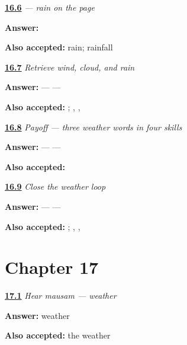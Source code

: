 \noindent\begin{minipage}[t]{\linewidth}
\raggedright
\hyperlink{review-MW-C11-barsaat-dictation}{\textbf{16.6}} \emph{ — rain on the page}\par
\small \textbf{Answer:} \par
\footnotesize \textbf{Also accepted:}  rain;  rainfall
\end{minipage}\par\medskip

\noindent\begin{minipage}[t]{\linewidth}
\raggedright
\hyperlink{review-MW-R11-weather-three-recall}{\textbf{16.7}} \emph{Retrieve wind, cloud, and rain}\par
\small \textbf{Answer:}  —  — \par
\footnotesize \textbf{Also accepted:}   ; , , 
\end{minipage}\par\medskip

\noindent\begin{minipage}[t]{\linewidth}
\raggedright
\hyperlink{review-MW-C11-weather-three-payoff}{\textbf{16.8}} \emph{Payoff — three weather words in four skills}\par
\small \textbf{Answer:}  —  — \par
\footnotesize \textbf{Also accepted:}   
\end{minipage}\par\medskip

\noindent\begin{minipage}[t]{\linewidth}
\raggedright
\hyperlink{review-MW-R11-weather-close-recall}{\textbf{16.9}} \emph{Close the weather loop}\par
\small \textbf{Answer:}  —  — \par
\footnotesize \textbf{Also accepted:}   ; , , 
\end{minipage}\par\medskip

\section*{Chapter 17}

\noindent\begin{minipage}[t]{\linewidth}
\raggedright
\hyperlink{review-MW-C12-hear-mausam-meaning}{\textbf{17.1}} \emph{Hear \emph{mausam} — weather}\par
\small \textbf{Answer:} weather\par
\footnotesize \textbf{Also accepted:} the weather
\end{minipage}\par\medskip

